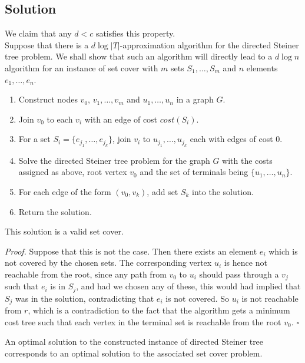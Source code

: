 \documentclass[a4paper]{article}
\newenvironment{proof}{\begin{breakbox}\textit{Proof.}}{\hfill$\square$\end{breakbox}}
\newcommand{\nl}{\vspace{0.2cm}\\}
\begin{document}
\subsection{Solution}
We claim that any $d < c$ satisfies this property.\nl
Suppose that there is a $d \log |T|$-approximation algorithm for the directed Steiner tree problem. We shall show that such an algorithm will directly lead to a $d \log n$ algorithm for an instance of
set cover with $m$ sets $S_1, \ldots, S_m$ and $n$ elements $e_1, \ldots, e_n$.
\begin{enumerate}
    \item Construct nodes $v_0$, $v_1, \ldots, v_m$ and $u_1, \ldots, u_n$ in a graph $G$.
    \item Join $v_0$ to each $v_i$ with an edge of cost $cost(S_i)$.
    \item For a set $S_i = \{e_{j_1}, \ldots, e_{j_k}\}$, join $v_i$ to $u_{j_1}, \ldots, u_{j_k}$ each with edges of cost $0$.
    \item Solve the directed Steiner tree problem for the graph $G$ with the costs assigned as above, root vertex $v_0$ and the set of terminals being $\{u_1, \ldots, u_n\}$.
    \item For each edge of the form $(v_0, v_k)$, add set $S_k$ into the solution.
    \item Return the solution.
\end{enumerate}

\begin{claim}
    This solution is a valid set cover.
\end{claim}

\begin{proof}
    Suppose that this is not the case. Then there exists an element $e_i$ which is not covered by the chosen sets. The corresponding vertex $u_i$ is hence not reachable from the root, since any
    path from $v_0$ to $u_i$ should pass through a $v_j$ such that $e_i$ is in $S_j$, and had we chosen any of these, this would had implied that $S_j$ was in the solution, contradicting that
    $e_i$ is not covered. So $u_i$ is not reachable from $r$, which is a contradiction to the fact that the algorithm gets a minimum cost tree such that each vertex in the terminal set
    is reachable from the root $v_0$.
\end{proof}

\begin{claim}
    An optimal solution to the constructed instance of directed Steiner tree corresponds to an optimal solution to the associated set cover problem.
\end{claim}
\end{document}
